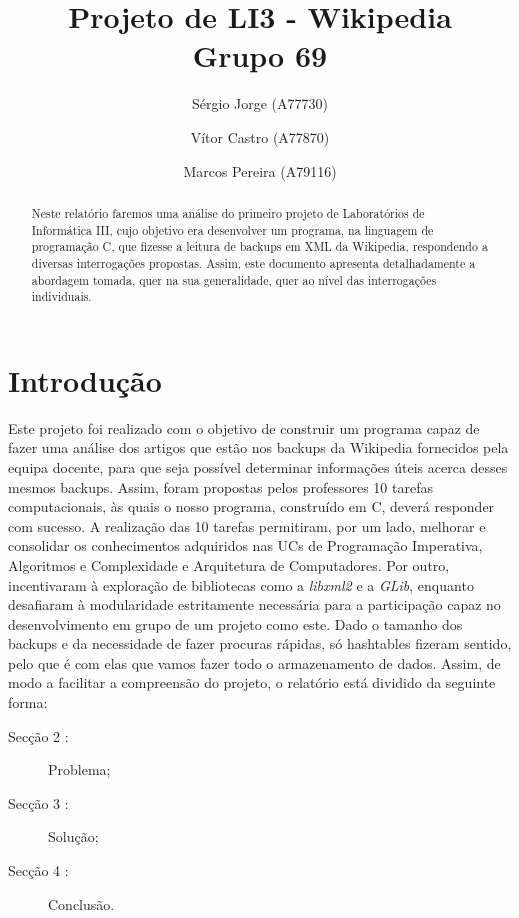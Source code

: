\documentclass[a4paper]{article}
\title{Projeto de LI3 - Wikipedia\\Grupo 69}
\author{Sérgio Jorge (A77730) \and Vítor Castro (A77870) \and Marcos Pereira (A79116)}
\date{}
\begin{document}
\maketitle

\begin{abstract}
Neste relatório faremos uma análise do primeiro projeto de Laboratórios de Informática III, cujo objetivo era desenvolver um programa, na linguagem de programação C, que fizesse a leitura de backups em XML da Wikipedia, respondendo a diversas interrogações propostas. Assim, este documento apresenta detalhadamente a abordagem tomada, quer na sua generalidade, quer ao nível das interrogações individuais.
\end{abstract}

\tableofcontents

\section{Introdução}
\label{sec:intro}
Este projeto foi realizado com o objetivo de construir um programa capaz de fazer uma análise dos artigos que estão nos backups da Wikipedia fornecidos pela equipa docente, para que seja possível determinar informações úteis acerca desses mesmos backups.
Assim, foram propostas pelos professores 10 tarefas computacionais, às quais o nosso programa, construído em C, deverá responder com sucesso. A realização das 10 tarefas permitiram, por um lado, melhorar e consolidar os conhecimentos adquiridos nas UCs de Programação Imperativa, Algoritmos e Complexidade e Arquitetura de Computadores. Por outro, incentivaram à exploração de bibliotecas como a \textit{libxml2} e a \textit{GLib}, enquanto desafiaram à modularidade estritamente necessária para a participação capaz no desenvolvimento em grupo de um projeto como este.
Dado o tamanho dos backups e da necessidade de fazer procuras rápidas, só hashtables fizeram sentido, pelo que é com elas que vamos fazer todo o armazenamento de dados.
Assim, de modo a facilitar a compreensão do projeto, o relatório está dividido da seguinte forma:
\begin{description}
    \item[Secção 2 :] Problema;
    \item[Secção 3 :] Solução;
    \item[Secção 4 :] Conclusão.
\end{description}
\end{document}
